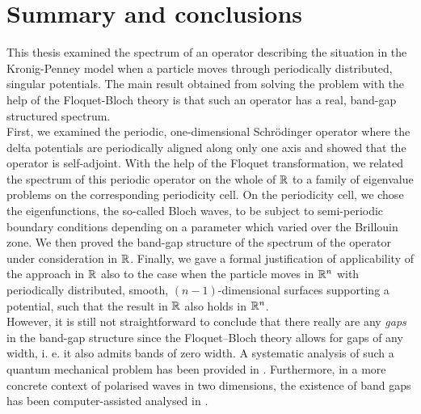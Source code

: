 \chapter{Summary and conclusions} \label{chap:8}
	
This thesis examined the spectrum of an operator describing the situation in the Kronig-Penney model when a particle moves through periodically distributed, singular potentials. The main result obtained from solving the problem with the help of the Floquet-Bloch theory is that such an operator has a real, band-gap structured spectrum.
~\\

First, we examined the periodic, one-dimensional Schrödinger operator where the delta potentials are periodically aligned along only one axis and showed that the operator is self-adjoint. With the help of the Floquet transformation, we related the spectrum of this periodic operator on the whole of $\mathbb{R}$ to a family of eigenvalue problems on the corresponding periodicity cell. On the periodicity cell, we chose the eigenfunctions, the so-called Bloch waves, to be subject to semi-periodic boundary conditions depending on a parameter which varied over the Brillouin zone. We then proved the band-gap structure of the spectrum of the operator under consideration in $\mathbb{R}$. Finally, we gave a formal justification of applicability of the approach in $\mathbb{R}$ also to the case when the particle moves in $\mathbb{R}^{n}$ with periodically distributed, smooth, $(n-1)$-dimensional surfaces supporting a potential, such that the result in $\mathbb{R}$ also holds in $\mathbb{R}^{n}$. 
~\\

However, it is still not straightforward to conclude that there really are any \textit{gaps} in the band-gap structure since the Floquet–Bloch theory allows for gaps of any width, i. e. it also admits bands of zero width. A systematic analysis of such a quantum mechanical problem has been provided in \cite{albeverio2012solvable}. Furthermore, in a more concrete context of polarised waves in two dimensions, the existence of band gaps has been computer-assisted analysed in \cite{hoang2009computer}. 
~\\

